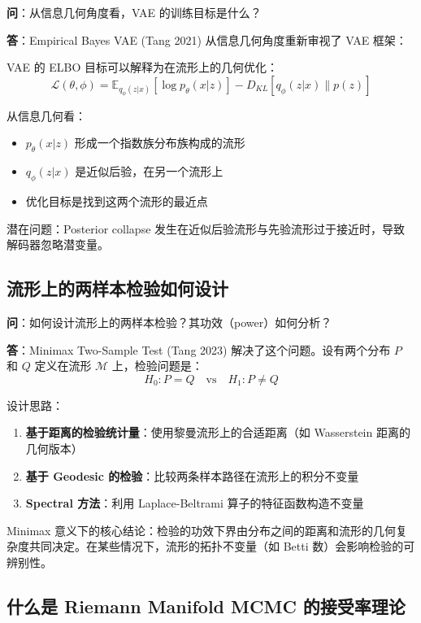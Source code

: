 \textbf{问}：从信息几何角度看，VAE 的训练目标是什么？

\textbf{答}：Empirical Bayes VAE (Tang 2021) 从信息几何角度重新审视了 VAE 框架：

VAE 的 ELBO 目标可以解释为在流形上的几何优化：
$$\mathcal{L}(\theta, \phi) = \mathbb{E}_{q_\phi(z|x)}[\log p_\theta(x|z)] - D_{KL}[q_\phi(z|x) \| p(z)]$$

从信息几何看：
\begin{itemize}
    \item $p_\theta(x|z)$ 形成一个指数族分布族构成的流形
    \item $q_\phi(z|x)$ 是近似后验，在另一个流形上
    \item 优化目标是找到这两个流形的最近点
\end{itemize}

潜在问题：Posterior collapse 发生在近似后验流形与先验流形过于接近时，导致解码器忽略潜变量。

\subsection{流形上的两样本检验如何设计}\label{sec:qa-two-sample-test-manifold}

\textbf{问}：如何设计流形上的两样本检验？其功效（power）如何分析？

\textbf{答}：Minimax Two-Sample Test (Tang 2023) 解决了这个问题。设有两个分布 $P$ 和 $Q$ 定义在流形 $\mathcal{M}$ 上，检验问题是：
$$H_0: P = Q \quad \text{vs} \quad H_1: P \neq Q$$

设计思路：
\begin{enumerate}
    \item \textbf{基于距离的检验统计量}：使用黎曼流形上的合适距离（如 Wasserstein 距离的几何版本）
    \item \textbf{基于 Geodesic 的检验}：比较两条样本路径在流形上的积分不变量
    \item \textbf{Spectral 方法}：利用 Laplace-Beltrami 算子的特征函数构造不变量
\end{enumerate}

Minimax 意义下的核心结论：检验的功效下界由分布之间的距离和流形的几何复杂度共同决定。在某些情况下，流形的拓扑不变量（如 Betti 数）会影响检验的可辨别性。

\subsection{什么是 Riemann Manifold MCMC 的接受率理论}\label{sec:qa-rmcmc-acceptance}

